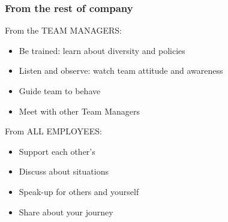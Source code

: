 \begin{frame}
\frametitle{From the rest of company}
\vskip 1.0cm
From the \textcolor{isvblue}{TEAM MANAGERS}:
\vskip 0.2cm
\begin{itemize}
\item \textcolor{isvblue}{Be trained}: learn about diversity and policies
\item \textcolor{isvblue}{Listen and observe}: watch team attitude and awareness  
\item \textcolor{isvblue}{Guide team} to behave
\item \textcolor{isvblue}{Meet with other Team Managers}
\end{itemize}
\vskip 0.3cm
From \textcolor{isvblue}{ALL EMPLOYEES}:
\vskip 0.2cm
\begin{itemize}
\item \textcolor{isvblue}{Support each other's}
\item \textcolor{isvblue}{Discuss about situations}
\item \textcolor{isvblue}{Speak-up} for others and yourself
\item \textcolor{isvblue}{Share about your journey}
\end{itemize}
\end{frame}
